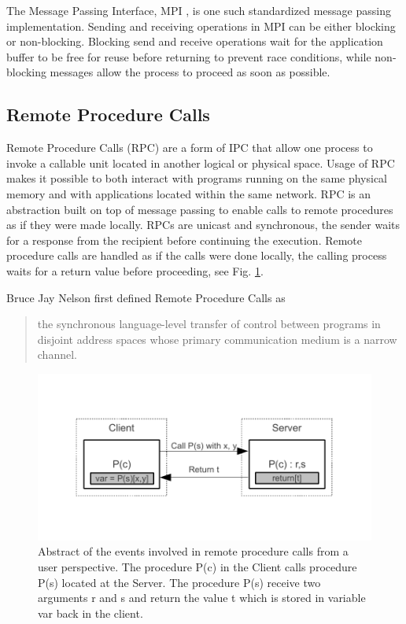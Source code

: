 The Message Passing Interface, MPI \cite{mpi3stand}, is one such standardized message passing implementation. Sending and receiving operations in MPI can be either blocking or non-blocking. Blocking send and receive operations wait for the application buffer to be free for reuse before returning to prevent race conditions, while non-blocking messages allow the process to proceed as soon as possible.

\subsection{Remote Procedure Calls}
Remote Procedure Calls (RPC) are a form of IPC that allow one process to invoke a callable unit \cite{Eac} located in another logical or physical space. Usage of RPC makes it possible to both interact with programs running on the same physical memory and with applications located within the same network. RPC is an abstraction built on top of message passing to enable calls to remote procedures as if they were made locally.
RPCs are unicast and synchronous, the sender waits for a response from the recipient before continuing the execution. Remote procedure calls are handled as if the calls were done locally, the calling process waits for a return value before proceeding, see Fig. \ref{rpc}.

Bruce Jay Nelson first defined Remote Procedure Calls as
\begin{quotation}
\centering
[...] the synchronous language-level transfer of control between programs in disjoint address spaces whose primary communication medium is a narrow channel.  \cite{Nelson:1981:RPC:910306}
\end{quotation}

\begin{figure}[t]
		\centering	\includegraphics{part_2/remote_procedure_calls/rpc.pdf}
		\caption{Abstract of the events involved in remote procedure calls from a user perspective.
The procedure P(c) in the Client calls procedure P(s) located at the Server. The procedure P(s) receive two arguments r and s and return the value t which is stored in variable var back in the client.}
		\label{rpc} 
\end{figure}

